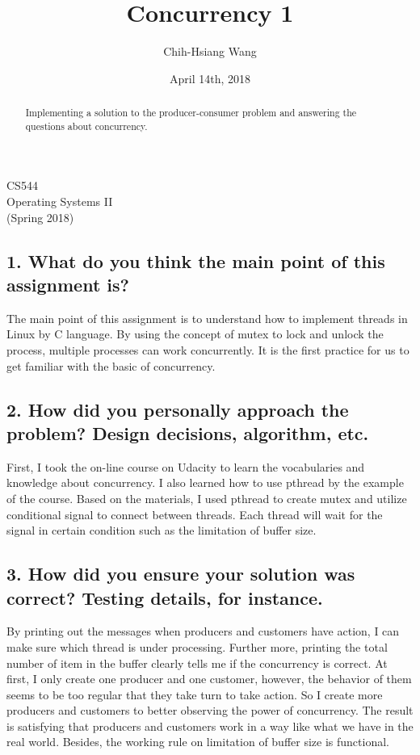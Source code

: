 \documentclass[english,10pt,letterpaper,onecolumn]{IEEEtran}
\title{Concurrency 1}
\author{
  Chih-Hsiang Wang
}
\date{April 14th, 2018}
\begin{document}
\begin{titlepage} 
\maketitle
\begin{center}
CS544\\
Operating Systems II\\
(Spring 2018)
\vspace{50 mm}
\end{center}

\begin{abstract}
Implementing a solution to the producer-consumer problem and answering the questions about concurrency.
\end{abstract}
\end{titlepage}

\clearpage
\subsection*{\bf 1. What do you think the main point of this assignment is?}
The main point of this assignment is to understand how to implement threads in Linux by C language. By using the concept of mutex to lock and unlock the process, multiple processes can work concurrently. It is the first practice for us to get familiar with the basic of concurrency.

\subsection*{\bf 2. How did you personally approach the problem? Design decisions, algorithm, etc.}
First, I took the on-line course on Udacity to learn the vocabularies and knowledge about concurrency. I also learned how to use pthread by the example of the course. Based on the materials, I used pthread to create mutex and utilize conditional signal to connect between threads. Each thread will wait for the signal in certain condition such as the limitation of buffer size. 

\subsection*{\bf 3. How did you ensure your solution was correct? Testing details, for instance.}
By printing out the messages when producers and customers have action, I can make sure which thread is under processing. Further more, printing the total number of item in the buffer clearly tells me if the concurrency is correct. At first, I only create one producer and one customer, however, the behavior of them seems to be too regular that they take turn to take action. So I create more producers and customers to better observing the power of concurrency. The result is satisfying that producers and customers work in a way like what we have in the real world. Besides, the working rule on limitation of buffer size is functional.
\end{document}
